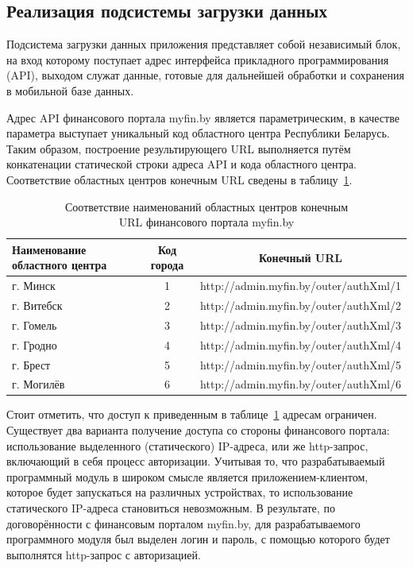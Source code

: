 \newpage



\subsection{Реализация подсистемы загрузки данных}
\label{subs:realization_network_requests}

Подсистема загрузки данных приложения представляет собой независимый блок,
на вход которому поступает адрес интерфейса прикладного программирования (API),
выходом служат данные, готовые для дальнейшей обработки и сохранения
в мобильной базе данных.

Адрес API финансового портала myfin.by является параметрическим,
в качестве параметра выступает уникальный код областного центра Республики Беларусь.
Таким образом, построение результирующего URL выполняется путём конкатенации
статической строки адреса API и кода областного центра.
Соответствие областных центров конечным URL сведены в таблицу~\ref{tbl:url_by_city}.
\begin{table} [h!]
  \caption{
    Соответствие наименований областных центров конечным \\
    \hspace{29.5mm} URL финансового портала myfin.by
  }\label{tbl:url_by_city}
    \begin{tabular}{| m{4.75cm} | c | c |}
      \hline

      Наименование \newline областного центра & Код  города & Конечный URL \\
      \hline

      г. Минск    & 1 & http://admin.myfin.by/outer/authXml/1 \\ \hline
      г. Витебск  & 2 & http://admin.myfin.by/outer/authXml/2 \\ \hline
      г. Гомель   & 3 & http://admin.myfin.by/outer/authXml/3 \\ \hline
      г. Гродно   & 4 & http://admin.myfin.by/outer/authXml/4 \\ \hline
      г. Брест    & 5 & http://admin.myfin.by/outer/authXml/5 \\ \hline
      г. Могилёв  & 6 & http://admin.myfin.by/outer/authXml/6 \\ \hline

    \end{tabular}
\end{table}

Стоит отметить, что доступ к приведенным в таблице~\ref{tbl:url_by_city} адресам
ограничен. Существует два варианта получение доступа со стороны финансового портала:
использование выделенного (статического) IP-адреса, или же http-запрос,
включающий в себя процесс авторизации. Учитывая то, что разрабатываемый
программный модуль в широком смысле является приложением-клиентом,
которое будет запускаться на различных устройствах,
то использование статического IP-адреса становиться невозможным. В результате,
по договорённости с финансовым порталом myfin.by, для разрабатываемого
программного модуля был выделен логин и пароль, с помощью которого будет
выполнятся http-запрос с авторизацией.

